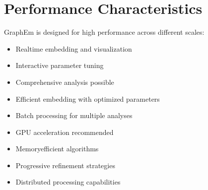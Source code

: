 \documentclass[letterpaper,10pt,english]{sphinxmanual}
\begin{document}
\chapter{Performance Characteristics}
\label{\detokenize{index:performance-characteristics}}
\sphinxAtStartPar
GraphEm is designed for high performance across different scales:
\begin{description}
\begin{itemize}
\item {} 
\sphinxAtStartPar
Real\sphinxhyphen{}time embedding and visualization

\item {} 
\sphinxAtStartPar
Interactive parameter tuning

\item {} 
\sphinxAtStartPar
Comprehensive analysis possible

\end{itemize}

\begin{itemize}
\item {} 
\sphinxAtStartPar
Efficient embedding with optimized parameters

\item {} 
\sphinxAtStartPar
Batch processing for multiple analyses

\item {} 
\sphinxAtStartPar
GPU acceleration recommended

\end{itemize}

\begin{itemize}
\item {} 
\sphinxAtStartPar
Memory\sphinxhyphen{}efficient algorithms

\item {} 
\sphinxAtStartPar
Progressive refinement strategies

\item {} 
\sphinxAtStartPar
Distributed processing capabilities

\end{itemize}

\end{description}
\end{document}
